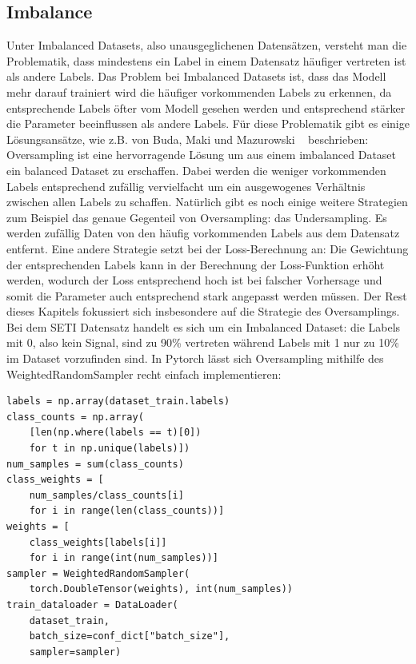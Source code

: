 \documentclass[12pt, a4paper]{article}
\begin{document}
\subsection{Imbalance}
Unter Imbalanced Datasets, also unausgeglichenen Datensätzen, versteht man die Problematik, dass mindestens ein Label in einem Datensatz häufiger vertreten ist als andere Labels. Das Problem bei Imbalanced Datasets ist, dass das Modell mehr darauf trainiert wird die häufiger vorkommenden Labels zu erkennen, da entsprechende Labels öfter vom Modell gesehen werden und entsprechend stärker die Parameter beeinflussen als andere Labels. Für diese Problematik gibt es einige Lösungsansätze, wie z.B. von Buda, Maki und Mazurowski ~\cite{o1} beschrieben:
\newline
Oversampling ist eine hervorragende Lösung um aus einem imbalanced Dataset ein balanced Dataset zu erschaffen. Dabei werden die weniger vorkommenden Labels entsprechend zufällig vervielfacht um ein ausgewogenes Verhältnis zwischen allen Labels zu schaffen. Natürlich gibt es noch einige weitere Strategien zum Beispiel das genaue Gegenteil von Oversampling: das Undersampling. Es werden zufällig Daten von den häufig vorkommenden Labels aus dem Datensatz entfernt. Eine andere Strategie setzt bei der Loss-Berechnung an: Die Gewichtung der entsprechenden Labels kann in der Berechnung der Loss-Funktion erhöht werden, wodurch der Loss entsprechend hoch ist bei falscher Vorhersage und somit die Parameter auch entsprechend stark angepasst werden müssen. Der Rest dieses Kapitels fokussiert sich insbesondere auf die Strategie des Oversamplings.
\newline
Bei dem SETI Datensatz handelt es sich um ein Imbalanced Dataset: die Labels mit 0, also \glqq kein Signal\grqq{}, sind zu 90\% vertreten während Labels mit 1 nur zu 10\% im Dataset vorzufinden sind. In Pytorch lässt sich Oversampling mithilfe des WeightedRandomSampler recht einfach implementieren:
\begin{lstlisting}
labels = np.array(dataset_train.labels)
class_counts = np.array(
	[len(np.where(labels == t)[0]) 
	for t in np.unique(labels)])
num_samples = sum(class_counts)
class_weights = [
	num_samples/class_counts[i] 
	for i in range(len(class_counts))]
weights = [
	class_weights[labels[i]] 
	for i in range(int(num_samples))]
sampler = WeightedRandomSampler(
	torch.DoubleTensor(weights), int(num_samples))
train_dataloader = DataLoader(
	dataset_train, 
	batch_size=conf_dict["batch_size"], 
	sampler=sampler)
\end{lstlisting}
\end{document}
